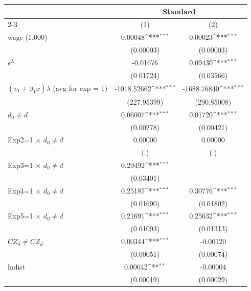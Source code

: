 {
\def\sym#1{\ifmmode^{#1}\else\(^{#1}\)\fi}
\begin{tabular}{l*{2}{c}}
\hline\hline
                    &\multicolumn{2}{c}{Standard}               \\\cmidrule(lr){2-3}
                    &\multicolumn{1}{c}{(1)}         &\multicolumn{1}{c}{(2)}         \\
\hline
wage (1,000)        &     0.00048\sym{***}&     0.00023\sym{***}\\
                    &   (0.00003)         &   (0.00003)         \\
[1em]
$ e^\lambda$        &    -0.01676         &     0.09430\sym{***}\\
                    &   (0.01724)         &   (0.03566)         \\
[1em]
$(v_{1} + \beta_{1}x) \lambda$  (avg for exp = 1)& -1018.52662\sym{***}& -1688.76840\sym{***}\\
                    & (227.95399)         & (290.85008)         \\
[1em]
$ d_{0} \neq d$     &     0.06007\sym{***}&     0.01720\sym{***}\\
                    &   (0.00278)         &   (0.00421)         \\
[1em]
Exp2=1 $\times$ $ d_{0} \neq d$&     0.00000         &     0.00000         \\
                    &         (.)         &         (.)         \\
[1em]
Exp3=1 $\times$ $ d_{0} \neq d$&     0.29492\sym{***}&                     \\
                    &   (0.03401)         &                     \\
[1em]
Exp4=1 $\times$ $ d_{0} \neq d$&     0.25185\sym{***}&     0.30776\sym{***}\\
                    &   (0.01690)         &   (0.01802)         \\
[1em]
Exp5=1 $\times$ $ d_{0} \neq d$&     0.21691\sym{***}&     0.25632\sym{***}\\
                    &   (0.01093)         &   (0.01313)         \\
[1em]
$ CZ_{0} \neq CZ_{d}$&     0.00344\sym{***}&    -0.00120         \\
                    &   (0.00051)         &   (0.00074)         \\
[1em]
lndist              &     0.00042\sym{**} &    -0.00004         \\
                    &   (0.00019)         &   (0.00029)         \\

\end{tabular}}
